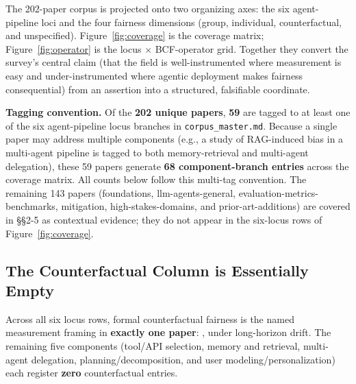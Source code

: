 \documentclass[acmsmall,nonacm]{acmart}
\begin{document}
The 202-paper corpus is projected onto two organizing axes: the six agent-pipeline loci and the four fairness dimensions (group, individual, counterfactual, and unspecified). Figure~\ref{fig:coverage} is the coverage matrix; Figure~\ref{fig:operator} is the locus $\times$ BCF-operator grid. Together they convert the survey's central claim (that the field is well-instrumented where measurement is easy and under-instrumented where agentic deployment makes fairness consequential) from an assertion into a structured, falsifiable coordinate.

\textbf{Tagging convention.} Of the \textbf{202 unique papers}, \textbf{59} are tagged to at least one of the six agent-pipeline locus branches in \texttt{corpus\_master.md}. Because a single paper may address multiple components (e.g., a study of RAG-induced bias in a multi-agent pipeline is tagged to both memory-retrieval and multi-agent delegation), these 59 papers generate \textbf{68 component-branch entries} across the coverage matrix. All counts below follow this multi-tag convention. The remaining 143 papers (foundations, llm-agents-general, evaluation-metrics-benchmarks, mitigation, high-stakes-domains, and prior-art-additions) are covered in \S\S{}2-5 as contextual evidence; they do not appear in the six-locus rows of Figure~\ref{fig:coverage}.

\subsection{The Counterfactual Column is Essentially Empty}

Across all six locus rows, formal counterfactual fairness is the named measurement framing in \textbf{exactly one paper}: \cite{she2025fairsense}, under long-horizon drift. The remaining five components (tool/API selection, memory and retrieval, multi-agent delegation, planning/decomposition, and user modeling/personalization) each register \textbf{zero} counterfactual entries.
\end{document}

